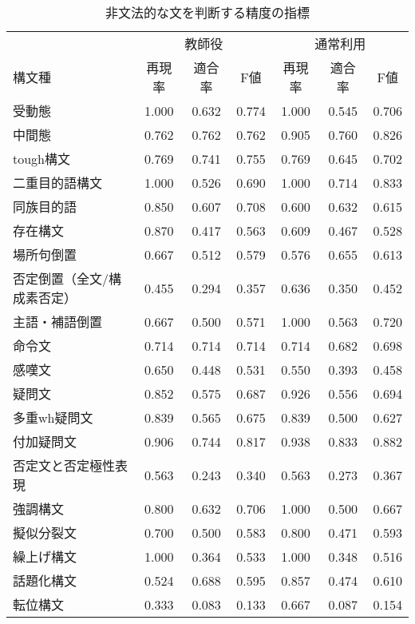 \begin{table}[H]
    \centering
    \small
    \tabcolsep 3pt
    \caption{非文法的な文を判断する精度の指標}
    \label{tab:sample2}
    \begin{tabular}{lcccccc}
    \hline
    \multicolumn{1}{l}{} & \multicolumn{3}{c}{教師役} & \multicolumn{3}{c}{通常利用}\\
    構文種 & 再現率 & 適合率 &F値 & 再現率 & 適合率 &F値\\
    \hline
    受動態 & 1.000 & 0.632 & 0.774 & 1.000 & 0.545 & 0.706 \\
    中間態 & 0.762 & 0.762 & 0.762 & 0.905 & 0.760 & 0.826 \\
    tough構文 & 0.769 & 0.741 & 0.755 & 0.769 & 0.645 & 0.702 \\
    二重目的語構文 & 1.000 & 0.526 & 0.690 & 1.000 & 0.714 & 0.833 \\
    同族目的語 & 0.850 & 0.607 & 0.708 & 0.600 & 0.632 & 0.615 \\
    存在構文 & 0.870 & 0.417 & 0.563 & 0.609 & 0.467 & 0.528 \\
    場所句倒置 & 0.667 & 0.512 & 0.579 & 0.576 & 0.655 & 0.613 \\
    否定倒置（全文/構成素否定） & 0.455 & 0.294 & 0.357 & 0.636 & 0.350 & 0.452 \\
    主語・補語倒置 & 0.667 & 0.500 & 0.571 & 1.000 & 0.563 & 0.720 \\
    命令文 & 0.714 & 0.714 & 0.714 & 0.714 & 0.682 & 0.698 \\
    感嘆文 & 0.650 & 0.448 & 0.531 & 0.550 & 0.393 & 0.458 \\
    疑問文 & 0.852 & 0.575 & 0.687 & 0.926 & 0.556 & 0.694 \\
    多重wh疑問文 & 0.839 & 0.565 & 0.675 & 0.839 & 0.500 & 0.627 \\
    付加疑問文 & 0.906 & 0.744 & 0.817 & 0.938 & 0.833 & 0.882 \\
    否定文と否定極性表現 & 0.563 & 0.243 & 0.340 & 0.563 & 0.273 & 0.367 \\
    強調構文 & 0.800 & 0.632 & 0.706 & 1.000 & 0.500 & 0.667 \\
    擬似分裂文 & 0.700 & 0.500 & 0.583 & 0.800 & 0.471 & 0.593 \\
    繰上げ構文 & 1.000 & 0.364 & 0.533 & 1.000 & 0.348 & 0.516 \\
    話題化構文 & 0.524 & 0.688 & 0.595 & 0.857 & 0.474 & 0.610 \\
    転位構文 & 0.333 & 0.083 & 0.133 & 0.667 & 0.087 & 0.154 \\

\end{tabular}
\end{table}
